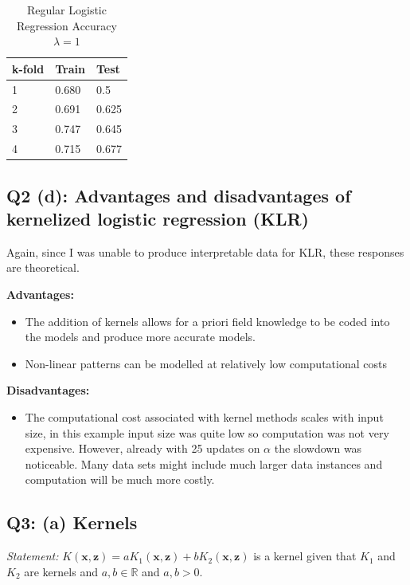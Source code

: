 \documentclass[11pt]{amsart}
\newcommand{\vek}[1]{\mathbf{#1}}
\begin{document}
\begin{table}[h!]
\centering
\begin{tabular}{lll}
\hline
k-fold & Train & Test  \\ \hline
1      & 0.680 & 0.5   \\ \hline
2      & 0.691 & 0.625 \\ \hline
3      & 0.747 & 0.645 \\ \hline
4      & 0.715 & 0.677 \\ \hline
\end{tabular}
\caption{Regular Logistic Regression Accuracy $\lambda=1$}
\label{fig:q2c_reg}
\end{table}

\subsection{Q2 (d): Advantages and disadvantages of kernelized logistic regression (KLR)}
Again, since I was unable to produce interpretable data for KLR, these  responses are theoretical.

{\bf Advantages:}

\begin{itemize}
	\item The addition of kernels allows for a priori field knowledge to be coded into the models and produce more accurate models.
	\item Non-linear patterns can be modelled at relatively low computational costs
\end{itemize}

{\bf Disadvantages:}
	\begin{itemize}
	\item The computational cost associated with kernel methods scales with input size, in this example input size was quite low so computation was not very expensive. However, already with 25 updates on $\alpha$ the slowdown was noticeable. Many data sets might include much larger data instances and computation will be much more costly.
	\end{itemize}
\subsection{Q3: (a) Kernels}

{\it Statement:} $K(\vek{x}, \vek{z}) = aK_1(\vek{x}, \vek{z}) + bK_{2}(\vek{x}, \vek{z})$ is a kernel given that $K_1$ and $K_2$ are kernels and $a,b \in \mathbb{R}$ and $a, b > 0$.
\end{document}
